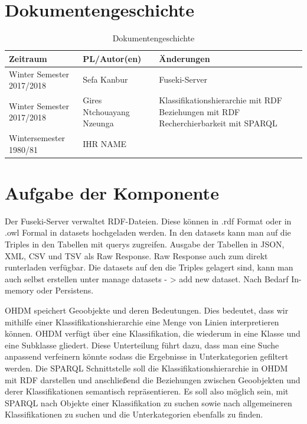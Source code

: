 \section{Dokumentengeschichte}
\begin{table}[h]
 \begin{tabular}{|l|l|p{4cm}|}
 \hline
 Zeitraum & PL/Autor(en) & Änderungen \\
 \hline
 Winter Semester 2017/2018 & Sefa Kanbur & Fuseki-Server
\\
\hline
 Winter Semester 2017/2018 & Gires Ntchouayang Nzeunga & 
Klassifikationshierarchie mit RDF \newline
Beziehungen mit RDF \newline
Recherchierbarkeit mit SPARQL\newline
 \\
\hline
Wintersemester 1980/81 & IHR NAME &
\\
 \hline
 \end{tabular}
 \caption{Dokumentengeschichte}
 \end{table}

\section{Aufgabe der Komponente}

Der Fuseki-Server verwaltet RDF-Dateien. Diese können in .rdf Format oder in .owl Formal in datasets hochgeladen werden.
In den datasets kann man auf die Triples in den Tabellen mit querys zugreifen. Ausgabe der Tabellen in JSON, XML, CSV und TSV als Raw Response. Raw Response auch zum direkt runterladen verfügbar. Die datasets auf den die Triples gelagert sind, kann man auch selbst erstellen unter manage datasets - > add new dataset. Nach Bedarf In-memory oder Persistens.

OHDM speichert Geoobjekte und deren Bedeutungen. Dies bedeutet, dass wir mithilfe einer Klassifikationshierarchie eine Menge von Linien interpretieren können. OHDM verfügt über eine Klassifikation, die wiederum in eine Klasse und eine Subklasse gliedert. Diese Unterteilung führt dazu, dass man eine Suche anpassend verfeinern könnte sodass die Ergebnisse in Unterkategorien gefiltert werden. Die SPARQL Schnittstelle soll die Klassifikationshierarchie in OHDM mit RDF darstellen und anschließend die Beziehungen zwischen Geoobjekten und derer Klassifikationen semantisch repräsentieren. Es soll also möglich sein, mit SPARQL nach Objekte einer Klassifikation zu suchen sowie nach allgemeineren Klassifikationen zu suchen und die Unterkategorien ebenfalls zu finden.


